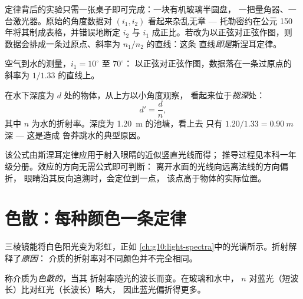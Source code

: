定律背后的实验只需一张桌子即可完成：一块有机玻璃半圆盘，
一把量角器、一台激光器。原始的角度数据对 $(i_1, i_2)$ 看起来杂乱无章 --- 
托勒密约在公元 150 年将其制成表格，并错误地断定
$i_2$ 与 $i_1$ 成正比。若改为以正弦对正弦作图，则
数据会排成一条过原点、斜率为 $n_1/n_2$ 的直线：这条
直线\emph{即是}斯涅耳定律。

\begin{omfigure}

{\small 空气到水的测量，$i_1 = 10^\circ$ 至 $70^\circ$：
以正弦对正弦作图，数据落在一条过原点的
斜率为 $1/1.33$ 的直线上。}
\end{omfigure}

\begin{proposition}[视深]\label{prop:g10:refraction:depth}
在水下深度为 $d$ 处的物体，从上方以小角度观察，
看起来位于\emph{视深}处：
\[
d' = \frac{d}{n} ,
\]
其中 $n$ 为水的折射率。深度为 \qty{1.20}{m} 的池塘，看上去
只有 $1.20/1.33 = \qty{0.90}{m}$ 深 --- 这是造成
鲁莽跳水的典型原因。
\end{proposition}
\admitted

\begin{remark}\label{rem:g10:refraction:depthhonest}
该公式由斯涅耳定律应用于射入眼睛的近似竖直光线而得；
推导过程见本科一年级分册。效应的方向无需公式即可判断：
离开水面的光线向远离法线的方向偏折，
眼睛沿其反向追溯时，会定位到一点，
该点高于物体的实际位置。
\end{remark}

\section{色散：每种颜色一条定律}

三棱镜能将白色阳光变为彩虹，正如
\cref{ch:g10:light-spectra}中的光谱所示。折射解释了\emph{原因}：
介质的折射率对不同颜色并不完全相同。

\begin{definition}[色散]\label{def:g10:refraction:dispersion}
称介质为\emph{色散的}，当其
折射率随光的波长而变。在玻璃和水中，
$n$ 对蓝光（短波长）比对红光（长波长）略大，
因此蓝光偏折得更多。
\end{definition}

